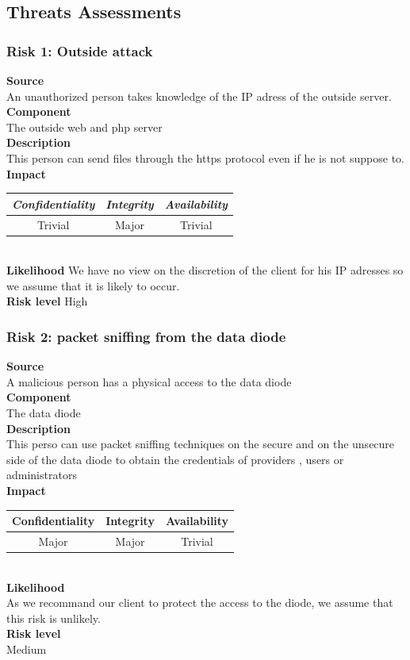 \documentclass[a4paper,11pt]{article}
\begin{document}
\subsection{Threats Assessments}
\subsubsection{Risk 1: Outside attack}
\textbf{Source} \\An unauthorized person takes knowledge of the IP adress of the outside server.\\
\textbf{Component} \\The outside web and php server\\
\textbf{Description}\\ This person can send files through the https protocol even if he is not suppose to. \\
\textbf{Impact}\\
\begin{tabular}{|c|c|c|}
\hline 
\emph{Confidentiality} & \emph{Integrity} & \emph{Availability} \\
\hline
Trivial & Major & Trivial\\
\hline
\end{tabular}\\
\textbf{Likelihood} We have no view on the discretion of the client for his IP adresses so we assume that it is likely to occur.\\
\textbf{Risk level} High \\

\subsubsection{Risk 2: packet sniffing from the data diode }
\textbf{Source} \\A malicious person has a physical access to the data diode\\
\textbf{Component} \\The data diode\\
\textbf{Description}\\ This perso can use packet sniffing techniques on the secure and on the unsecure side of the data diode to obtain the credentials of providers , users or administrators \\
\textbf{Impact}\\
\begin{tabular}{|c|c|c|}
\hline
Confidentiality & Integrity & Availability \\
\hline
Major & Major & Trivial \\
\hline
\end{tabular}\\
\textbf{Likelihood}\\ As we recommand our client to protect the access to the diode, we assume that this risk is unlikely.\\
\textbf{Risk level}\\Medium\\
\end{document}
